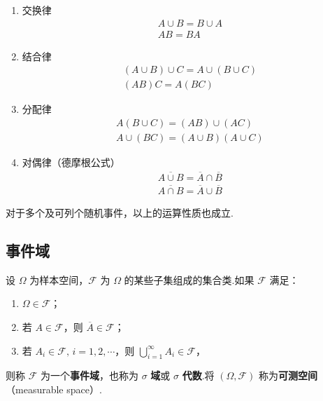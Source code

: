 \begin{property}
    \begin{enumerate}
        \item 交换律
        $$
        \begin{gathered}
            A \cup B = B \cup A \\
            AB=BA
        \end{gathered}
        $$
        \item 结合律
        $$
        \begin{gathered}
            (A \cup B) \cup C = A \cup (B \cup C) \\
            (AB)C=A(BC)
        \end{gathered}
        $$
        \item 分配律
        $$
        \begin{gathered}
            A(B \cup C) = (AB) \cup (AC) \\
            A \cup (BC) = (A \cup B)(A \cup C)
        \end{gathered}
        $$
        \item 对偶律（德摩根公式）
        $$
        \begin{gathered}
            \overline{A \cup B} = \overline{A} \cap \overline{B} \\
            \overline{A \cap B} = \overline{A} \cup \overline{B}
        \end{gathered}
        $$
    \end{enumerate}
\end{property}

对于多个及可列个随机事件，以上的运算性质也成立.

\subsection{事件域}

\begin{definition}
    \indent 设 $\varOmega$ 为样本空间，$\mathcal{F}$ 为 $\varOmega$ 的某些子集组成的集合类.如果 $\mathcal{F}$ 满足：
    \begin{enumerate}
        \item $\varOmega \in \mathcal{F}$；
        \item 若 $A \in \mathcal{F}$，则 $\overline{A} \in \mathcal{F}$；
        \item 若 $A_i \in \mathcal{F}, \, i=1,2,\cdots$，则 $\displaystyle\bigcup_{i=1}^\infty A_i \in \mathcal{F}$，
    \end{enumerate}
    则称 $\mathcal{F}$ 为一个\textbf{事件域}，也称为 $\sigma$ \textbf{域}或 $\sigma$ \textbf{代数}.将 $(\varOmega, \mathcal{F})$ 称为\textbf{可测空间}（measurable space）.
\end{definition}

